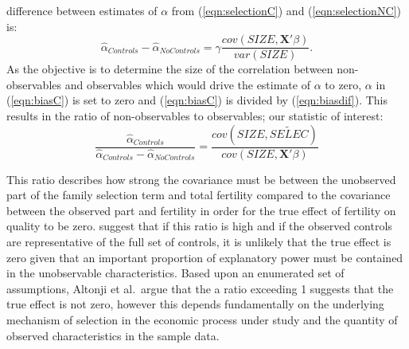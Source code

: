 \documentclass{article}[11pt,subeqn]
\newcommand{\vect}[1]{\mathbf{#1}}
\begin{document}
\begin{spacing}{1.5}
difference between estimates of $\alpha$ from (\ref{eqn:selectionC}) and (\ref{eqn:selectionNC}) is:
\begin{equation}
 \label{eqn:biasdif}
\hat\alpha_{Controls} - \hat\alpha_{NoControls} = \gamma\frac{cov(SIZE,\vect{X}'\beta)}{var(SIZE)}.
\end{equation}
As the objective is to determine the size of the correlation between non-observables and observables which would drive the estimate of $\alpha$ to zero, $\alpha$ in (\ref{eqn:biasC})
is set to zero and (\ref{eqn:biasC}) is divided by (\ref{eqn:biasdif}).  This results in the ratio of non-observables to observables; our statistic of interest:
\begin{equation}
 \label{eqn:Aratio}
\frac{\hat\alpha_{Controls}}{\hat\alpha_{Controls} - \hat\alpha_{NoControls}}=\frac{cov(SIZE,\widetilde{SELEC})}{cov(SIZE,\vect{X}'\beta)}
\end{equation}

This ratio describes how strong the covariance must be between the unobserved part of the family selection term and total fertility compared to the covariance between the observed
part and fertility in order for the true effect of fertility on quality to be zero.  \citet{Altonjietal2005} suggest that if this ratio is high and if the observed controls are
representative of the full set of controls, it is unlikely that the true effect is zero given that an important proportion of explanatory power must be contained in the unobservable 
characteristics.  Based upon an enumerated set of assumptions, Altonji et al.\ argue that the a ratio exceeding 1 suggests that the true effect is not zero, however this depends 
fundamentally on the underlying mechanism of selection in the economic process under study and the quantity of observed characteristics in the sample data.


\end{spacing}
\end{document}
